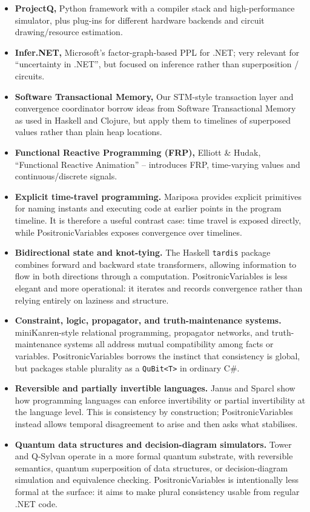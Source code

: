 \documentclass[a4paper,11pt]{article}
\begin{document}
\begin{itemize}
\item
  \textbf{ProjectQ,} Python framework with a compiler stack and high-performance simulator, plus plug-ins for different hardware backends and circuit drawing/resource estimation.\parencite{Steiger16ProjectQ}
\item
  \textbf{Infer.NET,} Microsoft's factor-graph-based PPL for .NET; very relevant for ``uncertainty in .NET'', but focused on inference rather than superposition / circuits.\parencite{Mic251}
\item
  \textbf{Software Transactional Memory,} Our STM-style transaction layer and convergence coordinator borrow ideas from Software Transactional Memory as used in Haskell and Clojure, but apply them to timelines of superposed values rather than plain heap locations.\parencite{Tim05}
\item
  \textbf{Functional Reactive Programming (FRP),} Elliott \& Hudak, ``Functional Reactive Animation'' -- introduces FRP, time-varying values and continuous/discrete signals.\parencite{Hud97}
\item
  \textbf{Explicit time-travel programming.}
  Mariposa provides explicit primitives for naming instants and executing code at
  earlier points in the program timeline.\parencite{MariposaGitHub} It is therefore
  a useful contrast case: time travel is exposed directly, while PositronicVariables
  exposes convergence over timelines.
\item
  \textbf{Bidirectional state and knot-tying.}
  The Haskell \texttt{tardis} package combines forward and backward state transformers,
  allowing information to flow in both directions through a computation.\parencite{TardisHackage}
  PositronicVariables is less elegant and more operational: it iterates and records
  convergence rather than relying entirely on laziness and structure.
\item
  \textbf{Constraint, logic, propagator, and truth-maintenance systems.}
  miniKanren-style relational programming, propagator networks, and truth-maintenance
  systems all address mutual compatibility among facts or variables.\parencite{MiniKanren,RadulSussman09,Doyle79TMS}
  PositronicVariables borrows the instinct that consistency is global, but packages
  stable plurality as a \texttt{QuBit<T>} in ordinary C\#.
\item
  \textbf{Reversible and partially invertible languages.}
  Janus and Sparcl show how programming languages can enforce invertibility or partial
  invertibility at the language level.\parencite{YokoyamaGluck07Janus,MatsudaWang24Sparcl}
  This is consistency by construction; PositronicVariables instead allows temporal
  disagreement to arise and then asks what stabilises.
\item
  \textbf{Quantum data structures and decision-diagram simulators.}
  Tower and Q-Sylvan operate in a more formal quantum substrate, with reversible
  semantics, quantum superposition of data structures, or decision-diagram simulation
  and equivalence checking.\parencite{YuanCarbin22Tower,BrandLaarman25QSylvan}
  PositronicVariables is intentionally less formal at the surface: it aims to make
  plural consistency usable from regular .NET code.
\end{itemize}
\end{document}

